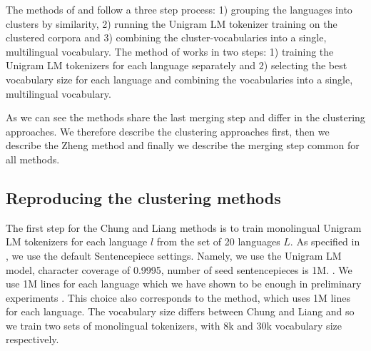 The methods of \citet{chung_improving_2020} and \citet{liang_xlm-v_2023} follow a three step process: 1) grouping the languages into clusters by similarity, 2) running the Unigram LM tokenizer training on the clustered corpora and 3) combining the cluster-vocabularies into a single, multilingual vocabulary. The method of \citet{zheng_allocating_2021} works in two steps: 1) training the Unigram LM tokenizers for each language separately and 2) selecting the best vocabulary size for each language and combining the vocabularies into a single, multilingual vocabulary.

As we can see the methods share the last merging step and differ in the clustering approaches. We therefore describe the clustering approaches first, then we describe the Zheng method and finally we describe the merging step common for all methods.

\subsection{Reproducing the clustering methods}

The first step for the Chung and Liang methods is to train monolingual Unigram LM tokenizers for each language $l$ from the set of 20 languages $L$. As specified in \citet{chung_improving_2020}, we use the default Sentencepiece settings. Namely, we use the Unigram LM model, character coverage of 0.9995, number of seed sentencepieces is 1M. . We use 1M lines for each language which we have shown to be enough in preliminary experiments . This choice also corresponds to the \citet{zheng_allocating_2021} method, which uses 1M lines for each language. The vocabulary size differs between Chung and Liang and so we train two sets of monolingual tokenizers, with 8k and 30k vocabulary size respectively.

